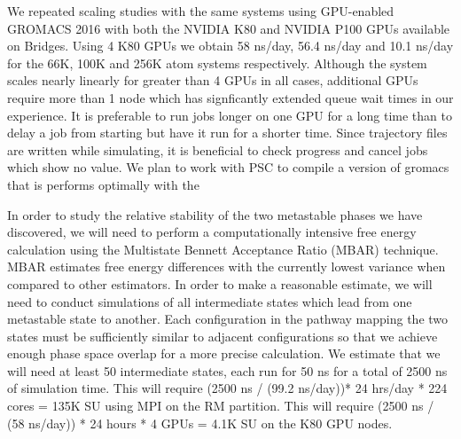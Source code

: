 We repeated scaling studies with the same systems using GPU-enabled 
GROMACS 2016 with both the NVIDIA K80 and NVIDIA P100 GPUs available on
Bridges. Using 4 K80 GPUs we obtain 58 ns/day, 56.4 ns/day and 10.1 ns/day
for the 66K, 100K and 256K atom systems respectively. Although the system
scales nearly linearly for greater than 4 GPUs in all cases, additional
GPUs require more than 1 node which has signficantly extended queue wait
times in our experience. It is preferable to run jobs longer on one GPU
for a long time than to delay a job from starting but have it run for a
shorter time. Since trajectory files are written while simulating, it
is beneficial to check progress and cancel jobs which show no value.
We plan to work with PSC to compile a version of gromacs that is performs
optimally with the
 

In order to study the relative stability of the two metastable phases 
we have discovered, we will need to perform a computationally 
intensive free energy calculation using the Multistate Bennett
Acceptance Ratio (MBAR) technique. MBAR estimates free energy 
differences with the currently lowest variance when compared to other
estimators. In order to make a reasonable estimate, we will need to 
conduct simulations of all intermediate states which lead from one metastable
state to another. Each configuration in the pathway mapping the two
states must be sufficiently similar to adjacent configurations so that
we achieve enough phase space overlap for a more precise calculation. 
We estimate that we will need at least 50 intermediate states, each run
for 50 ns for a total of 2500 ns of simulation time. This will require 
(2500 ns / (99.2 ns/day))* 24 hrs/day * 224 cores = 135K SU using
MPI on the RM partition. This will require (2500 ns / (58 ns/day)) * 24
hours * 4 GPUs = 4.1K SU on the K80 GPU nodes.

